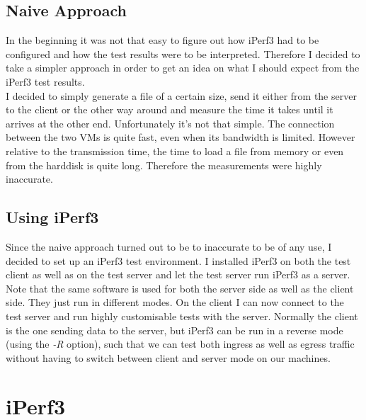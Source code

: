 \subsection{Naive Approach}

In the beginning it was not that easy to figure out how iPerf3 had to be configured and how the test results were to be interpreted. Therefore I decided to take a simpler approach in order to get an idea on what I should expect from the iPerf3 test results. 
\\
I decided to simply generate a file of a certain size, send it either from the server to the client or the other way around and measure the time it takes until it arrives at the other end. Unfortunately it's not that simple. The connection between the two \acsp{VM} is quite fast, even when its bandwidth is limited. However relative to the transmission time, the time to load a file from memory or even from the harddisk is quite long. Therefore the measurements were highly inaccurate.

\subsection{Using iPerf3}

Since the naive approach turned out to be to inaccurate to be of any use, I decided to set up an iPerf3 test environment. I installed iPerf3 on both the test client as well as on the test server and let the test server run iPerf3 as a server. Note that the same software is used for both the server side as well as the client side. They just run in different modes. On the client I can now connect to the test server and run highly customisable tests with the server. Normally the client is the one sending data to the server, but iPerf3 can be run in a reverse mode (using the \textit{-R} option), such that we can test both ingress as well as egress traffic without having to switch between client and server mode on our machines.

\section{iPerf3}


